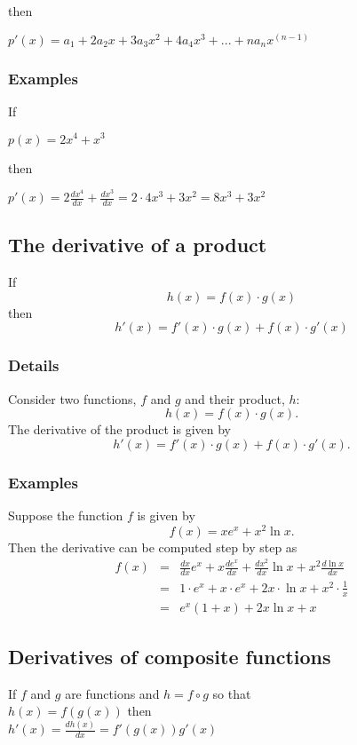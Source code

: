 \documentclass[12pt,a4paper]{article}
\theoremstyle{regla}
\theoremstyle{remark}
\theoremstyle{definition}
\theoremstyle{nonumberbreak}
\begin{document}
then

$p'(x)=a_1+2a_2x+3a_3x^2+4a_4x^3+...+na_n x^{(n-1)}$
\subsubsection{Examples}
\begin{xmpl}
If

$p(x)=2x^4+x^3$

then

$p'(x)=2\frac{dx^4}{dx}+\frac{dx^3}{dx}=2 \cdot 4x^3 +3x^2 = 8x^3 +3x^2$
\end{xmpl}

\subsection{The derivative of a product}
\begin{fbox}
\begin{minipage}{0.97\textwidth}
If
$$
h(x)=f(x)\cdot g(x)
$$
then
$$
h'(x)=f'(x)\cdot g(x)+f(x)\cdot g'(x)
$$

\end{minipage}
\end{fbox}
\subsubsection{Details}
Consider two functions, $f$ and $g$ and their product, $h$:
$$
h(x)=f(x)\cdot g(x).
$$
The derivative of the product is given by
$$
h'(x)=f'(x)\cdot g(x)+f(x)\cdot g'(x).
$$

\subsubsection{Examples}
\begin{xmpl}
Suppose the function $f$ is given by
$$
f(x)=xe^x+x^2\ln x .
$$
Then the derivative can be computed step by step as
\begin{eqnarray*}
f(x)&=&\frac{dx}{dx}e^x+x\frac{de^x}{dx}+\frac{dx^2}{dx}\ln x +x^2\frac{d \ln x}{dx}\\
    &=&1\cdot e^x +     x \cdot e^x     + 2x \cdot \ln x     + x^2 \cdot \frac{1}{x}\\
    &=&e^x \left ( 1+x \right ) + 2x \ln  x +x
\end{eqnarray*}
\end{xmpl}


\subsection{Derivatives of composite functions}
\begin{fbox}
\begin{minipage}{0.97\textwidth}
If $f$ and $g$ are functions and $h=f  \circ g$ so that\\

$h(x) = f(g(x))$ then \\

$h'(x) = \frac{dh(x)}{dx} = f'(g(x)) g'(x)$
\end{minipage}
\end{fbox}
\end{document}
